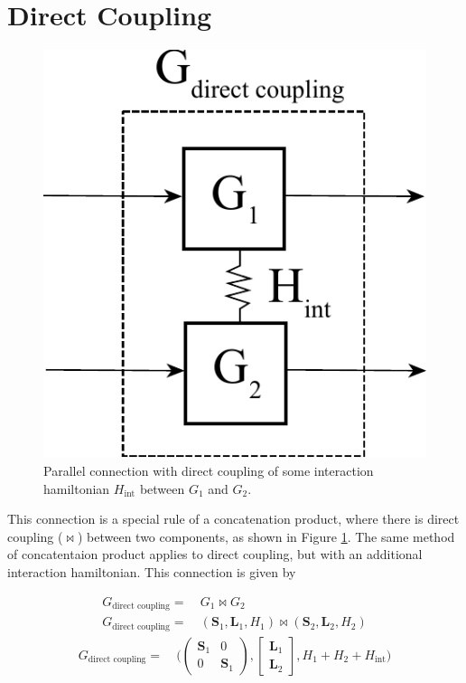 \documentclass[a4paper]{article}
\begin{document}
\section*{Direct Coupling}

\begin{figure}[H]
\centering
\includegraphics[width = 7.5 cm]{Direct_coupling.pdf}
\caption{Parallel connection with direct coupling of some interaction hamiltonian $H_{\text{int}}$ between $G_1$ and $G_2$. 
}
\label{fig:direct_coupling}
\end{figure}  

This connection is a special rule of a concatenation product, where there is direct coupling ($\bowtie$) between two components, as shown in Figure \ref{fig:direct_coupling}. The same method of concatentaion product applies to direct coupling, but with an additional interaction hamiltonian. This connection is given by 

\begin{align*}
    G_{\text{direct coupling}} = & \ G_1 \bowtie G_2 \\
    G_{\text{direct coupling}} = & \ (\textbf{S}_1,\textbf{L}_1,H_1) \bowtie (\textbf{S}_2,\textbf{L}_2,H_2)
\end{align*}
\begin{align}
    G_{\text{direct coupling}} = & \ \Bigg( \begin{pmatrix} \textbf{S}_1 & 0 \\ 0 & \textbf{S}_1\end{pmatrix},\begin{bmatrix} \textbf{L}_1 \\ \textbf{L}_2 \end{bmatrix},H_1 + H_2 + H_{\text{int}} \Bigg)
    \label{eq:direct_coupling}
\end{align}
\end{document}
